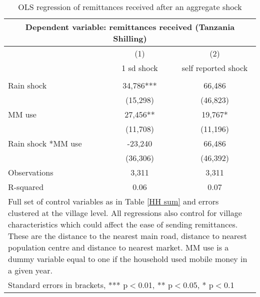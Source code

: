 \begin{table}
\centering 
\caption{OLS regression of remittances received after an aggregate shock} \label{remittance}
\begin{tabular}{lcc}
\multicolumn{3}{c}{Dependent variable: remittances received (Tanzania Shilling)} \\ \hline
 & (1) & (2)  \\
  & 1 sd shock & self reported shock \\ \hline
  &  &   \\
Rain shock & 34,786*** & 66,486 \\
 & (15,298) & (46,823) \\
MM use & 27,456** & 19,767* \\
 & (11,708) & (11,196) \\
Rain shock *MM use & -23,240  & 66,486  \\
 & (36,306) & (46,392)  \\
Observations & 3,311 & 3,311  \\
R-squared & 0.06 & 0.07 \\ \hline
\multicolumn{3}{p{11cm}}{Full set of control variables as in Table \ref{HH sum} and errors clustered at the village level. All regressions also control for village characteristics which could affect the ease of sending remittances. These are the distance to the nearest main road, distance to nearest population centre and distance to nearest market. MM use is a dummy variable equal to one if the household used mobile money in a given year.} \\
\multicolumn{3}{l}{ Standard errors in brackets, *** p$<$0.01, ** p$<$0.05, * p$<$0.1} \\
\end{tabular}
\end{table}